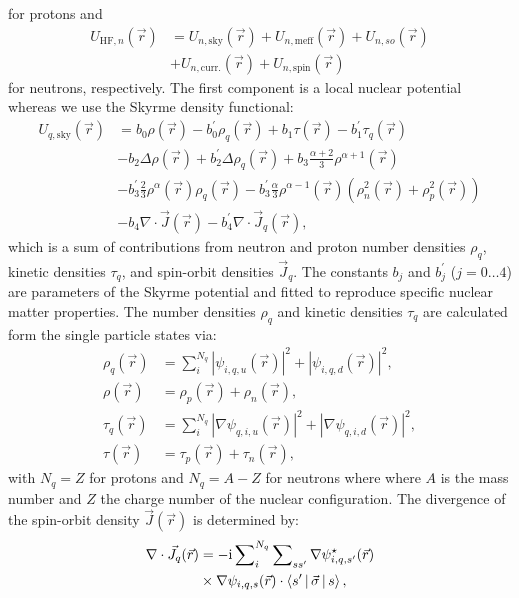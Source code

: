\documentclass[4p]{elsarticle}
\begin{document}
for protons and
\begin{align}
U_{\mathrm{HF}, n} (\vec{r}) &= U_{n,\mathrm{sky}} (\vec{r}) + U_{n, \mathrm{meff}}  (\vec{r}) + U_{n, so}  (\vec{r}) \nonumber\\
& + U_{n, \mathrm{curr.}}  (\vec{r}) + U_{n, \mathrm{spin}}  (\vec{r}) 
\label{Uneutrons}
\end{align}
for neutrons, respectively. The first component is a local nuclear potential whereas we use the Skyrme density functional:
\begin{align}
U_{q,\mathrm{sky}} (\vec{r}) &=  b_0 \rho (\vec{r}) - b^{\prime}_0 \rho_q (\vec{r}) + b_1 \tau (\vec{r}) - b^{\prime}_1 \tau_q (\vec{r}) \nonumber\\
&- b_2 \Delta \rho (\vec{r}) + b^{\prime}_2 \Delta \rho_q (\vec{r}) + b_3 \frac{\alpha+2}{3} \rho^{\alpha + 1}  (\vec{r}) \nonumber\\
&- b^{\prime}_3 \frac{2}{3} \rho^\alpha  (\vec{r}) \rho_q  (\vec{r}) - b^{\prime}_3 \frac{\alpha}{3} \rho^{\alpha - 1}  (\vec{r}) \left( \rho^2_n (\vec{r}) + \rho^2_p  (\vec{r}) \right) \nonumber\\
&- b_4 \nabla \cdot \vec{J}  (\vec{r}) - b_4^\prime \nabla \cdot \vec{J} _q   (\vec{r}),            
\label{Uskyrme}       
\end{align}
which is a sum of contributions from neutron and proton number densities $\rho_q$, kinetic densities $\tau_q$, and spin-orbit densities $\vec{J}_q$. The constants $b_j$ and $b^{\prime}_j$ ($j=0 \dots 4$) are parameters of the Skyrme potential and fitted to reproduce specific nuclear matter properties. The number densities $\rho_q$ and kinetic densities $\tau_q$ are calculated form the single particle states via: 
\begin{align}
\rho_q (\vec{r}) &= \sum\nolimits_{i}^{N_q} \left| \psi_{i,q,u} (\vec{r}) \right|^2 +  \left| \psi_{i,q,d} (\vec{r}) \right|^2 ,\\ 
\rho (\vec{r}) &= \rho_p (\vec{r})+ \rho_n (\vec{r}), \\
\tau_q (\vec{r}) &= \sum\nolimits_{i}^{N_q} \left| \nabla \psi_{q,i,u} (\vec{r}) \right|^2 +  \left| \nabla \psi_{q,i,d} (\vec{r}) \right|^2, \\ 
\tau(\vec{r}) &= \tau_p (\vec{r})+ \tau_n (\vec{r}),
\end{align}
with $N_q = Z$ for protons and $N_q = A-Z$ for neutrons where where $A$ is the mass number and $Z$ the charge number of the nuclear configuration. The divergence of the spin-orbit density $\vec{J}(\vec{r})$ is determined by:
\begin{align}
\nabla \cdot \vec{J}_q (\vec{r}) & = -\mathrm{i} \sum\nolimits_i^{N_q} \sum\nolimits_{s s^\prime} \nabla \psi_{i, q, s^\prime}^\star (\vec{r}) \nonumber\\
& \times \nabla \psi_{i,q,s} (\vec{r})  \cdot  \Braket{ s^\prime  | \vec{\sigma} | s} , 
\label{divJ}
\end{align}
\end{document}
